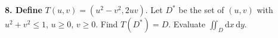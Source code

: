 \textbf{8. Define} \(T(u,v) = (u^2 - v^2, 2uv)\). Let \(D^*\) be the set of \((u,v)\) with \(u^2 + v^2 \leq 1\), \(u \geq 0\), \(v \geq 0\). Find \(T(D^*) = D\). Evaluate \(\iint_D \mathrm{d}x \, \mathrm{d}y\).
